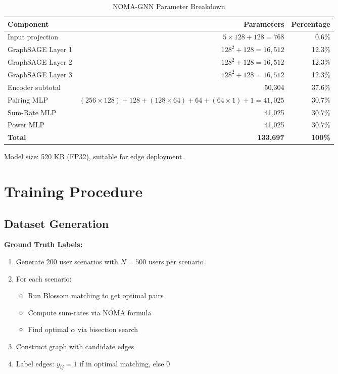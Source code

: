 \begin{table}[H]
\centering
\begin{tabular}{lrr}
\toprule
\textbf{Component} & \textbf{Parameters} & \textbf{Percentage} \\
\midrule
Input projection & $5 \times 128 + 128 = 768$ & 0.6\% \\
GraphSAGE Layer 1 & $128^2 + 128 = 16,512$ & 12.3\% \\
GraphSAGE Layer 2 & $128^2 + 128 = 16,512$ & 12.3\% \\
GraphSAGE Layer 3 & $128^2 + 128 = 16,512$ & 12.3\% \\
\midrule
Encoder subtotal & 50,304 & 37.6\% \\
\midrule
Pairing MLP & $(256 \times 128) + 128 + (128 \times 64) + 64 + (64 \times 1) + 1 = 41,025$ & 30.7\% \\
Sum-Rate MLP & 41,025 & 30.7\% \\
Power MLP & 41,025 & 30.7\% \\
\midrule
\textbf{Total} & \textbf{133,697} & \textbf{100\%} \\
\bottomrule
\end{tabular}
\caption{NOMA-GNN Parameter Breakdown}
\end{table}

Model size: 520 KB (FP32), suitable for edge deployment.

\section{Training Procedure}

\subsection{Dataset Generation}

\textbf{Ground Truth Labels:}
\begin{enumerate}
    \item Generate 200 user scenarios with $N = 500$ users per scenario
    \item For each scenario:
    \begin{itemize}
        \item Run Blossom matching to get optimal pairs
        \item Compute sum-rates via NOMA formula
        \item Find optimal $\alpha$ via bisection search
    \end{itemize}
    \item Construct graph with candidate edges
    \item Label edges: $y_{ij} = 1$ if in optimal matching, else 0
\end{enumerate}

